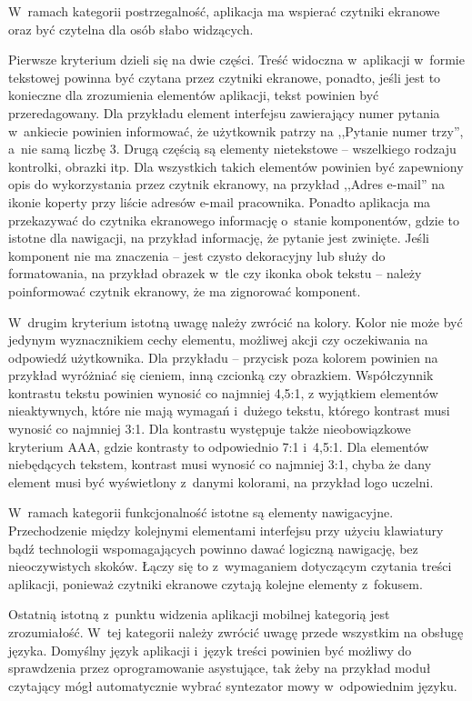 \documentclass{pracamgr}
\begin{document}
W~ramach kategorii postrzegalność, aplikacja ma wspierać czytniki ekranowe oraz być czytelna
dla osób słabo widzących.

Pierwsze kryterium dzieli się na dwie części. Treść widoczna
w~aplikacji w~formie tekstowej powinna być czytana przez czytniki ekranowe, ponadto,
jeśli jest to konieczne dla zrozumienia elementów aplikacji, tekst powinien być przeredagowany.
Dla przykładu element interfejsu zawierający numer pytania w~ankiecie powinien informować, że
użytkownik patrzy na ,,Pytanie numer trzy'', a~nie samą liczbę 3. Drugą częścią są elementy
nietekstowe -- wszelkiego rodzaju kontrolki, obrazki itp. Dla wszystkich takich elementów
powinien być zapewniony opis do wykorzystania przez czytnik ekranowy, na przykład ,,Adres
e-mail'' na ikonie koperty przy liście adresów e-mail pracownika. Ponadto aplikacja ma
przekazywać do czytnika ekranowego informację o~stanie komponentów, gdzie to istotne dla
nawigacji, na przykład informację, że pytanie jest zwinięte. Jeśli komponent nie ma 
znaczenia -- jest czysto dekoracyjny lub służy do formatowania, na przykład obrazek w~tle
czy ikonka obok tekstu -- należy poinformować czytnik ekranowy, że ma zignorować komponent.

W~drugim kryterium istotną uwagę należy zwrócić na kolory. Kolor nie może być jedynym
wyznacznikiem cechy elementu, możliwej akcji czy oczekiwania na odpowiedź użytkownika.
Dla przykładu -- przycisk poza kolorem powinien na przykład wyróżniać się cieniem, inną
czcionką czy obrazkiem. Współczynnik kontrastu tekstu powinien wynosić co najmniej 4,5:1,
z wyjątkiem elementów nieaktywnych, które nie mają wymagań i~dużego tekstu, którego
kontrast musi wynosić co najmniej 3:1. Dla kontrastu występuje także nieobowiązkowe
kryterium AAA, gdzie kontrasty to odpowiednio 7:1 i~4,5:1. Dla elementów niebędących
tekstem, kontrast musi wynosić co najmniej 3:1, chyba że dany element musi być wyświetlony
z~danymi kolorami, na przykład logo uczelni.

W~ramach kategorii funkcjonalność istotne są elementy nawigacyjne. Przechodzenie
między kolejnymi elementami interfejsu przy użyciu klawiatury bądź technologii
wspomagających powinno dawać logiczną nawigację, bez nieoczywistych skoków. 
Łączy się to z~wymaganiem dotyczącym czytania treści aplikacji, ponieważ czytniki ekranowe
czytają kolejne elementy z~fokusem.

Ostatnią istotną z~punktu widzenia aplikacji mobilnej kategorią jest zrozumiałość.
W~tej kategorii należy zwrócić uwagę przede wszystkim na obsługę języka.
Domyślny język aplikacji i~język treści powinien być możliwy do sprawdzenia przez
oprogramowanie asystujące, tak żeby na przykład moduł czytający mógł automatycznie wybrać
syntezator mowy w~odpowiednim języku.
\end{document}
